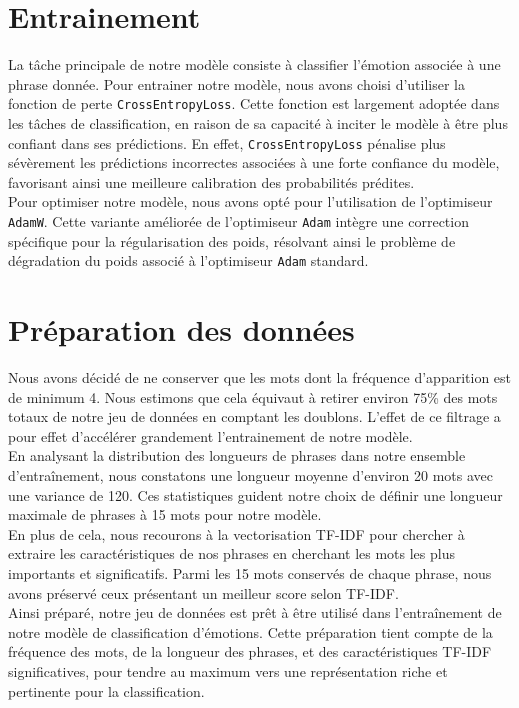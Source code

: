\documentclass{article}
\begin{document}
\section{Entrainement}
La tâche principale de notre modèle consiste à classifier l'émotion associée à une phrase donnée. Pour entrainer notre modèle, nous avons choisi d'utiliser la fonction de perte \texttt{CrossEntropyLoss}. Cette fonction est largement adoptée dans les tâches de classification, en raison de sa capacité à inciter le modèle à être plus confiant dans ses prédictions. En effet, \texttt{CrossEntropyLoss} pénalise plus sévèrement les prédictions incorrectes associées à une forte confiance du modèle, favorisant ainsi une meilleure calibration des probabilités prédites. \\
Pour optimiser notre modèle, nous avons opté pour l'utilisation de l'optimiseur \texttt{AdamW}. Cette variante améliorée de l'optimiseur \texttt{Adam} intègre une correction spécifique pour la régularisation des poids, résolvant ainsi le problème de dégradation du poids associé à l'optimiseur \texttt{Adam} standard. 

\section{Préparation des données}
Nous avons décidé de ne conserver que les mots dont la fréquence d’apparition est de minimum 4. Nous estimons que cela équivaut à retirer environ 75\% des mots totaux de notre jeu de données en comptant les doublons. L’effet de ce filtrage a pour effet d’accélérer grandement l’entrainement de notre modèle. \\
En analysant la distribution des longueurs de phrases dans notre ensemble d'entraînement, nous constatons une longueur moyenne d'environ 20 mots avec une variance de 120. Ces statistiques guident notre choix de définir une longueur maximale de phrases à 15 mots pour notre modèle. \\
En plus de cela, nous recourons à la vectorisation TF-IDF pour chercher à extraire les caractéristiques de nos phrases en cherchant les mots les plus importants et significatifs. Parmi les 15 mots conservés de chaque phrase, nous avons préservé ceux présentant un meilleur score selon TF-IDF. \\
Ainsi préparé, notre jeu de données est prêt à être utilisé dans l'entraînement de notre modèle de classification d'émotions. Cette préparation tient compte de la fréquence des mots, de la longueur des phrases, et des caractéristiques TF-IDF significatives, pour tendre au maximum vers une représentation riche et pertinente pour la classification.
\end{document}
